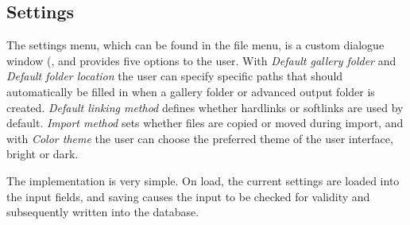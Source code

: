 \subsection{Settings}

The settings menu, which can be found in the file menu, is a custom dialogue window (, and provides five options to the user. With \emph{Default gallery folder} and \emph{Default folder location} the user can specify specific paths that should automatically be filled in when a gallery folder or advanced output folder is created. \emph{Default linking method} defines whether hardlinks or softlinks are used by default. \emph{Import method} sets whether files are copied or moved during import, and with \emph{Color theme} the user can choose the preferred theme of the user interface, bright or dark.

The implementation is very simple. On load, the current settings are loaded into the input fields, and saving causes the input to be checked for validity and subsequently written into the database.